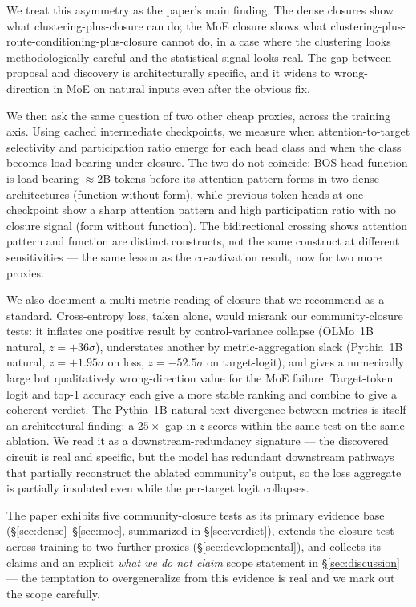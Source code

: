 \documentclass[11pt]{article}
\newcommand{\zsig}[1]{$z = #1\sigma$}
\begin{document}
We treat this asymmetry as the paper's main finding. The dense closures show
what clustering-plus-closure can do; the MoE closure shows what
clustering-plus-route-conditioning-plus-closure cannot do, in a case where
the clustering looks methodologically careful and the statistical signal
looks real. The gap between proposal and discovery is architecturally
specific, and it widens to wrong-direction in MoE on natural inputs even
after the obvious fix.

We then ask the same question of two other cheap proxies, across the
training axis. Using cached intermediate checkpoints, we measure when
attention-to-target selectivity and participation ratio emerge for each
head class and when the class becomes load-bearing under closure. The two
do not coincide: BOS-head function is load-bearing $\approx 2$B tokens
before its attention pattern forms in two dense architectures (function
without form), while previous-token heads at one checkpoint show a sharp
attention pattern and high participation ratio with no closure signal
(form without function). The bidirectional crossing shows attention pattern
and function are distinct constructs, not the same construct at different
sensitivities --- the same lesson as the co-activation result, now for two
more proxies.

We also document a multi-metric reading of closure that we recommend as a
standard. Cross-entropy loss, taken alone, would misrank our community-closure
tests: it inflates one positive result by control-variance collapse (OLMo~1B
natural, \zsig{+36}), understates another by metric-aggregation slack
(Pythia~1B natural, \zsig{+1.95} on loss, \zsig{-52.5} on target-logit), and
gives a numerically large but qualitatively wrong-direction value for the MoE
failure. Target-token logit and top-1 accuracy each give a more stable
ranking and combine to give a coherent verdict. The Pythia~1B natural-text
divergence between metrics is itself an architectural finding: a $25\times$
gap in $z$-scores within the same test on the same ablation. We read it as a
downstream-redundancy signature --- the discovered circuit is real and
specific, but the model has redundant downstream pathways that partially
reconstruct the ablated community's output, so the loss aggregate is
partially insulated even while the per-target logit collapses.

The paper exhibits five community-closure tests as its primary evidence
base (\S\ref{sec:dense}--\S\ref{sec:moe}, summarized in
\S\ref{sec:verdict}), extends the closure test across training to two
further proxies (\S\ref{sec:developmental}), and collects its claims and an
explicit \emph{what we do not claim} scope statement in
\S\ref{sec:discussion} --- the temptation to overgeneralize from this
evidence is real and we mark out the scope carefully.
\end{document}
